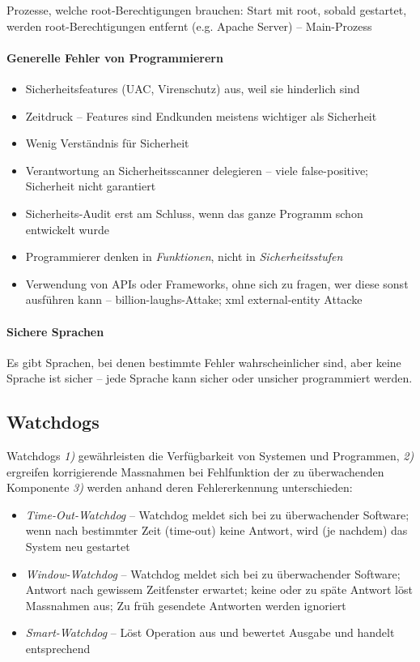 \documentclass[a4paper,12pt]{article}
\begin{document}
Prozesse, welche root-Berechtigungen brauchen: Start mit root, sobald gestartet, werden root-Berechtigungen entfernt (e.g. Apache Server) -- Main-Prozess

\paragraph{Generelle Fehler von Programmierern}
\begin{itemize}
\item Sicherheitsfeatures (UAC, Virenschutz) aus, weil sie hinderlich sind
\item Zeitdruck -- Features sind Endkunden meistens wichtiger als Sicherheit
\item Wenig Verständnis für Sicherheit
\item Verantwortung an Sicherheitsscanner delegieren -- viele false-positive; Sicherheit nicht garantiert
\item Sicherheits-Audit erst am Schluss, wenn das ganze Programm schon entwickelt wurde
\item Programmierer denken in \emph{Funktionen}, nicht in \emph{Sicherheitsstufen}
\item Verwendung von APIs oder Frameworks, ohne sich zu fragen, wer diese sonst ausführen kann -- billion-laughs-Attake; xml external-entity Attacke
\end{itemize}

\paragraph{Sichere Sprachen}
Es gibt Sprachen, bei denen bestimmte Fehler wahrscheinlicher sind, aber keine Sprache ist sicher -- jede Sprache kann sicher oder unsicher programmiert werden.


\subsection{Watchdogs}
Watchdogs \emph{1)} gewährleisten die Verfügbarkeit von Systemen und Programmen, \emph{2)} ergreifen korrigierende Massnahmen bei Fehlfunktion der zu überwachenden Komponente \emph{3)} werden anhand deren Fehlererkennung unterschieden:

\begin{itemize}
\item \emph{Time-Out-Watchdog} -- Watchdog meldet sich bei zu überwachender Software; wenn nach bestimmter Zeit (time-out) keine Antwort, wird (je nachdem) das System neu gestartet
\item \emph{Window-Watchdog} -- Watchdog meldet sich bei zu überwachender Software; Antwort nach gewissem Zeitfenster erwartet; keine oder zu späte Antwort löst Massnahmen aus; Zu früh gesendete Antworten werden ignoriert
\item \emph{Smart-Watchdog} -- Löst Operation aus und bewertet Ausgabe und handelt entsprechend
\end{itemize}
\end{document}
